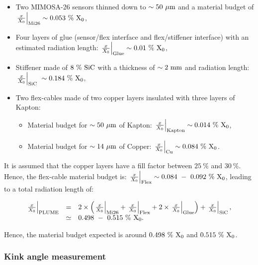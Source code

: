      \begin{itemize}
       \item Two \gls{MIMOSA}-26 sensors thinned down to $\sim 50~\rm{\mu m}$ and a material budget of $\left. \frac{x}{X_0} \right|_{\rm{Mi26}} \sim 0.053~\%~\rm{X_{0}}$,
       \item Four layers of glue (sensor/flex interface and flex/stiffener interface) with an estimated radiation length: $\left. \frac{x}{X_0} \right|_{\rm{Glue}} \sim 0.01~\%~\rm{X_0}$,
       \item Stiffener made of $8~\%~\rm{SiC}$ with a thickness of $\sim 2~\rm{mm}$ and radiation length: $\left. \frac{x}{X_0} \right|_{\rm{SiC}} ~\sim 0.184~\%~\rm{X_{0}}$,
       \item Two flex-cables made of two copper layers insulated with three layers of Kapton:
       \begin{itemize}
         \item Material budget for $\sim 50~\rm{\mu m}$ of Kapton: $\left. \frac{x}{X_0} \right|_{\rm{Kapton}} \sim 0.014~\%~\rm{X_{0}}$,
         \item Material budget for $\sim 14~\rm{\mu m}$ of Copper: $\left. \frac{x}{X_0} \right|_{\rm{Cu}} \sim 0.084~\%~\rm{X_{0}}$.
       \end{itemize}
     \end{itemize}

     It is assumed that the copper layers have a fill factor between $25~\%$ and $30~\%$.
     Hence, the flex-cable material budget is: $\left. \frac{x}{X_0} \right|_{\rm{Flex}} \sim 0.084~-~0.092~\%~\rm{X_0}$, leading to a total radiation length of:

     \begin{equation}
       \begin{array}{lcl}
         \left. \frac{x}{X_0} \right|_{\rm{PLUME}} & = & 2 \times \left( \left. \frac{x}{X_0} \right|_{\rm{Mi26}} + \left. \frac{x}{X_0} \right|_{\rm{Flex}} + 2 \times \left. \frac{x}{X_0} \right|_{\rm{Glue}}\right) + \left. \frac{x}{X_0} \right|_{\rm{SiC}}, \\
         & \simeq & 0.498~-~0.515~\%~\rm{X_0}.
       \end{array}
     \end{equation}

     Hence, the material budget expected is around $0.498~\%~\rm{X_0}$ and $0.515~\%~\rm{X_0}$.

     \subsubsection{Kink angle measurement}

